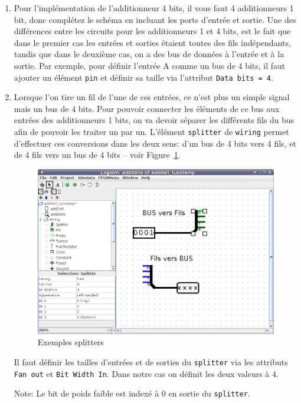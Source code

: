 \documentclass[nosolution]{exercice}
\begin{document}
\begin{enumerate}
\item Pour l'implémentation de l'additionneur 4 bits, il vous faut 4 additionneurs 1 bit, donc complétez le schéma en
incluant les ports d'entrée et sortie. Une des différences entre les circuits pour les additionneurs 1 et 4 bits, est le
fait que dans le premier cas les entrées et sorties étaient toutes des fils indépendants, tandis que dans le deuxième
cas, on a des bus de données à l'entrée et à la sortie. Par exemple, pour définir l'entrée A comme un bus de 4 bits, il
faut ajouter un élément \texttt{pin} et définir sa taille via l'attribut \texttt{Data bits = 4}.

\item Lorsque l'on tire un fil de l'une de ces entrées, ce n'est plus un simple signal mais un bus de 4 bits. Pour
pouvoir connecter les éléments de ce bus aux entrées des additionneurs 1 bits, on va devoir séparer les différents fils
du bus afin de pouvoir les traiter un par un. L'élément \texttt{splitter} de \texttt{wiring} permet d'effectuer ces
conversions dans les deux sens: d'un bus de 4 bits vers 4 fils, et de 4 fils vers un bus de 4 bits --
voir Figure~\ref{fig_splitter}.

\begin{figure}[H]
\begin{center}
\includegraphics[width=350pt]{images/logisim_splitters.png}
\caption{\label{fig_splitter}Exemples splitters}
\end{center}
\end{figure}

Il faut définir les tailles d'entrées et de sorties du \texttt{splitter} via les attributs \texttt{Fan out} et
\texttt{Bit Width In}. Dans notre cas on définit les deux valeurs à 4.

Note: Le bit de poids faible est indexé à 0 en sortie du \texttt{splitter}.

\end{enumerate}
\end{document}
